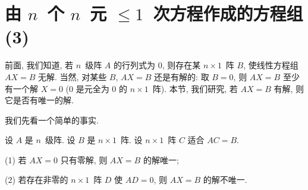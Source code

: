 \documentclass[../libro.tex]{subfiles}
\begin{document}
\KunAsteriskoEnEnhavtabelo
\section{\texorpdfstring{由 \(n\)~个 \(n\)~元
    \({\leq} 1\)~次方程作成的方程组 (3)}%
{由 n 个 n 元 ≤1 次方程作成的方程组 (3)}}
\SenAsteriskoEnEnhavtabelo

\maldevigalegajxo

前面, 我们知道,
若 \(n\)~级阵 \(A\) 的行列式为 \(0\),
则存在某 \(n \times 1\)~阵 \(B\),
使线性方程组 \(AX = B\) 无解.
当然, 对某些 \(B\),
\(AX = B\) 还是有解的:
取 \(B = 0\),
则 \(AX = B\) 至少有一个解 \(X = 0\)
(\(0\) 是元全为 \(0\) 的 \(n \times 1\)~阵).
本节, 我们研究, 若 \(AX = B\) 有解,
则它是否有唯一的解.

我们先看一个简单的事实.

\begin{theorem}
    设 \(A\) 是 \(n\)~级阵.
    设 \(B\) 是 \(n \times 1\)~阵.
    设 \(n \times 1\)~阵 \(C\) 适合 \(AC = B\).

    (1)
    若 \(AX = 0\) 只有零解, 则 \(AX = B\) 的解唯一;

    (2)
    若存在非零的 \(n \times 1\)~阵 \(D\)
    使 \(AD = 0\),
    则 \(AX = B\) 的解不唯一.
\end{theorem}
\end{document}
